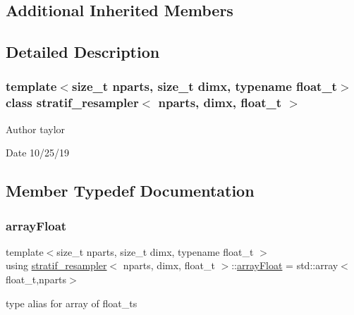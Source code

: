 \subsection*{Additional Inherited Members}


\subsection{Detailed Description}
\subsubsection*{template$<$size\+\_\+t nparts, size\+\_\+t dimx, typename float\+\_\+t$>$\newline
class stratif\+\_\+resampler$<$ nparts, dimx, float\+\_\+t $>$}

\begin{DoxyAuthor}{Author}
taylor 
\end{DoxyAuthor}
\begin{DoxyDate}{Date}
10/25/19 
\end{DoxyDate}


\subsection{Member Typedef Documentation}
\mbox{\label{classstratif__resampler_ad85a57b7463ac619bb3123a2cd20bb01}} 
\subsubsection{\texorpdfstring{array\+Float}{arrayFloat}}
{\footnotesize\ttfamily template$<$size\+\_\+t nparts, size\+\_\+t dimx, typename float\+\_\+t $>$ \\
using \hyperlink{classstratif__resampler}{stratif\+\_\+resampler}$<$ nparts, dimx, float\+\_\+t $>$\+::\hyperlink{classrbase_a6f76bef853e508cb5b6f546d231b06f5}{array\+Float} =  std\+::array$<$float\+\_\+t,nparts$>$}

type alias for array of float\+\_\+ts \mbox{\label{classstratif__resampler_a6feed5616bbd45f1bcf155fdf6348e19}} 
